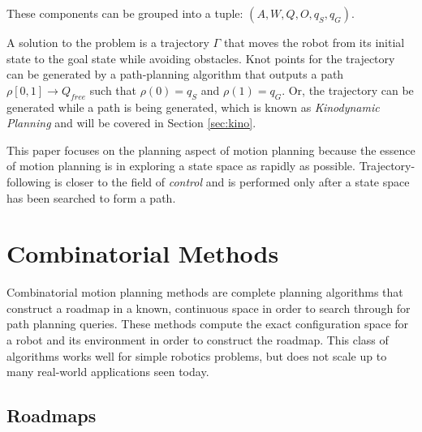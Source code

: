 \documentclass[10pt,conference]{ieeeconf}
\begin{document}
These components can be grouped into a tuple: $(A, W, Q, O, q_S, q_G)$. 



A solution to the problem is a trajectory $\Gamma$ that moves the robot from its initial state to the goal state while avoiding obstacles. Knot points for the trajectory can be generated by a path-planning algorithm that outputs a path $\rho[0,1] \rightarrow Q_{free}$ such that $\rho(0) = q_S$ and $\rho(1) = q_G$. Or, the trajectory can be generated while a path is being generated, which is known as \emph{Kinodynamic Planning} and will be covered in Section \ref{sec:kino}.

This paper focuses on the planning aspect of motion planning because the essence of motion planning is in exploring a state space as rapidly as possible. Trajectory-following  is closer to the field of \emph{control} and is performed only after a state space has been searched to form a path.


\section{Combinatorial Methods}
	
	Combinatorial motion planning methods are complete planning algorithms that construct a roadmap in a known, continuous space in order to search through for path planning queries. These methods compute the exact configuration space for a robot and its environment in order to construct the roadmap. This class of algorithms works well for simple robotics problems, but does not scale up to many real-world applications seen today. 
	
\subsection{Roadmaps}
	
\end{document}
